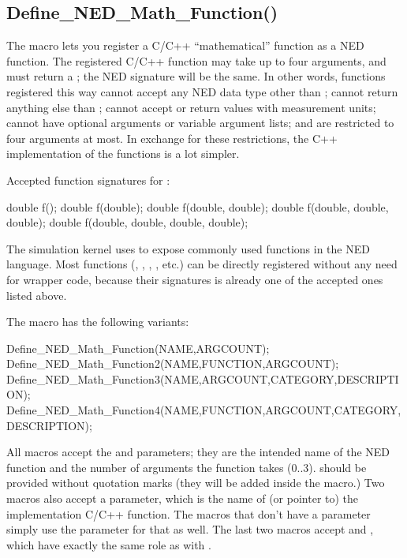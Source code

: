 \subsection{Define\_NED\_Math\_Function()}

The  macro lets you register a C/C++
``mathematical'' function as a NED function. The registered C/C++ function
may take up to four  arguments, and must return a ;
the NED signature will be the same. In other words, functions registered
this way cannot accept any NED data type other than ; cannot
return anything else than ; cannot accept or return values with
measurement units; cannot have optional arguments or variable argument
lists; and are restricted to four arguments at most. In exchange for these
restrictions, the C++ implementation of the functions is a lot simpler.

Accepted function signatures for :

\begin{cpp}
double f();
double f(double);
double f(double, double);
double f(double, double, double);
double f(double, double, double, double);
\end{cpp}

The simulation kernel uses  to expose
commonly used  functions in the NED language. Most 
functions (, , , , etc.)
can be directly registered without any need for wrapper code, because their
signatures is already one of the accepted ones listed above.

The macro has the following variants:

\begin{cpp}
Define_NED_Math_Function(NAME,ARGCOUNT);
Define_NED_Math_Function2(NAME,FUNCTION,ARGCOUNT);
Define_NED_Math_Function3(NAME,ARGCOUNT,CATEGORY,DESCRIPTION);
Define_NED_Math_Function4(NAME,FUNCTION,ARGCOUNT,CATEGORY,DESCRIPTION);
\end{cpp}

All macros accept the  and  parameters; they are
the intended name of the NED function and the number of 
arguments the function takes (0..3).  should be provided without
quotation marks (they will be added inside the macro.) Two macros also
accept a  parameter, which is the name of (or pointer to) the
implementation C/C++ function. The macros that don't have a 
parameter simply use the  parameter for that as well. The last
two macros accept  and , which have exactly
the same role as with .

